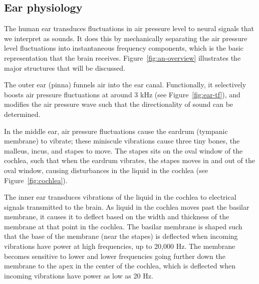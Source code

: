 \subsection{Ear physiology}

The human ear transduces fluctuations in
air pressure level to neural signals
that we interpret as sounds.
It does this by mechanically
separating the air pressure level fluctuations
into instantaneous frequency components,
which is the basic representation
that the brain receives.
Figure~\ref{fig:an-overview} illustrates
the major structures that will be discussed.


The outer ear (pinna) funnels air
into the ear canal.
Functionally, it selectively boosts
air pressure fluctuations at
around 3 kHz (see Figure~\ref{fig:ear-tf}),
and modifies the air pressure wave
such that the directionality
of sound can be determined.


In the middle ear,
air pressure fluctuations
cause the eardrum (tympanic membrane)
to vibrate;
these miniscule vibrations
cause three tiny bones,
the malleus, incus, and stapes to move.
The stapes sits on the oval window
of the cochlea,
such that when the eardrum vibrates,
the stapes moves in and out of the oval window,
causing disturbances in the liquid
in the cochlea
(see Figure~\ref{fig:cochlea}).


The inner ear transduces vibrations
of the liquid in the cochlea
to electrical signals transmitted
to the brain.
As liquid in the cochlea
moves past the basilar membrane,
it causes it to deflect
based on the width and thickness
of the membrane at that point
in the cochlea.
The basilar membrane
is shaped such that
the base of the membrane
(near the stapes)
is deflected when
incoming vibrations have power
at high frequencies,
up to 20,000 Hz.
The membrane becomes sensitive
to lower and lower frequencies
going further down the membrane
to the apex
in the center of the cochlea,
which is deflected when incoming vibrations
have power as low as 20 Hz.

